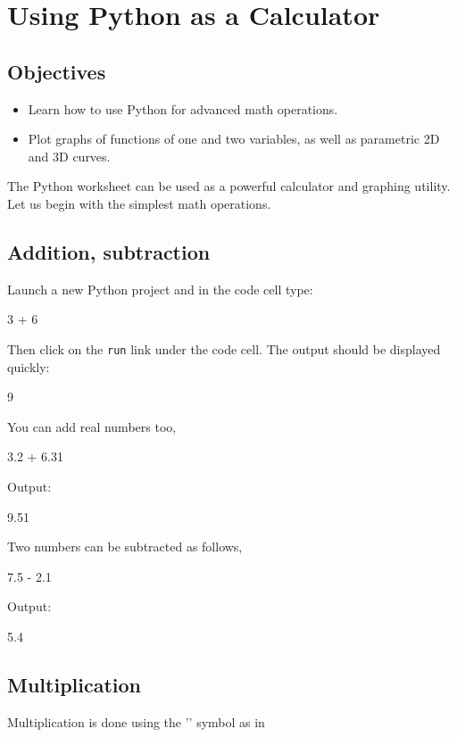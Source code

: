 
\section{Using Python as a Calculator} \label{sec:calc}

\subsection{Objectives}

\begin{itemize}
\item Learn how to use Python for advanced math operations.
\item Plot graphs of functions of one and two variables, as well as parametric 2D and 3D curves.
\end{itemize}
The Python worksheet can be used as a powerful calculator and graphing utility. 
Let us begin with the simplest math operations.

\subsection{Addition, subtraction}

Launch a new Python project and in the code cell type:

\begin{bluecode}
3 + 6
\end{bluecode}
Then click on the {\tt run} link under the code cell. The output should be displayed quickly:

\begin{bluecode}
9
\end{bluecode}
You can add real numbers too,
\begin{bluecode}
3.2 + 6.31
\end{bluecode}
Output:

\begin{greencode}
9.51
\end{greencode}
Two numbers can be subtracted as follows,

\begin{bluecode}
7.5 - 2.1
\end{bluecode}
Output:

\begin{greencode}
5.4
\end{greencode}

\subsection{Multiplication}
Multiplication is done using the '{\tt *}' symbol as in

